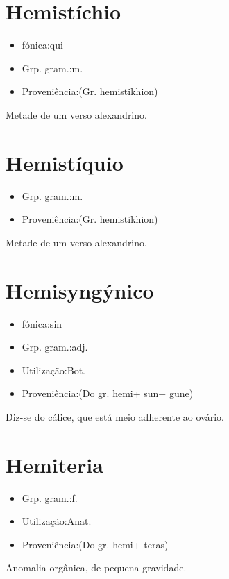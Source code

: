 \documentclass{article}
\begin{document}
\section{Hemistíchio}
\begin{itemize}
\item {fónica:qui}
\end{itemize}
\begin{itemize}
\item {Grp. gram.:m.}
\end{itemize}
\begin{itemize}
\item {Proveniência:(Gr. \textunderscore hemistikhion\textunderscore )}
\end{itemize}
Metade de um verso alexandrino.
\section{Hemistíquio}
\begin{itemize}
\item {Grp. gram.:m.}
\end{itemize}
\begin{itemize}
\item {Proveniência:(Gr. \textunderscore hemistikhion\textunderscore )}
\end{itemize}
Metade de um verso alexandrino.
\section{Hemisyngýnico}
\begin{itemize}
\item {fónica:sin}
\end{itemize}
\begin{itemize}
\item {Grp. gram.:adj.}
\end{itemize}
\begin{itemize}
\item {Utilização:Bot.}
\end{itemize}
\begin{itemize}
\item {Proveniência:(Do gr. \textunderscore hemi\textunderscore  + \textunderscore sun\textunderscore  + \textunderscore gune\textunderscore )}
\end{itemize}
Diz-se do cálice, que está meio adherente ao ovário.
\section{Hemiteria}
\begin{itemize}
\item {Grp. gram.:f.}
\end{itemize}
\begin{itemize}
\item {Utilização:Anat.}
\end{itemize}
\begin{itemize}
\item {Proveniência:(Do gr. \textunderscore hemi\textunderscore  + \textunderscore teras\textunderscore )}
\end{itemize}
Anomalia orgânica, de pequena gravidade.
\end{document}
